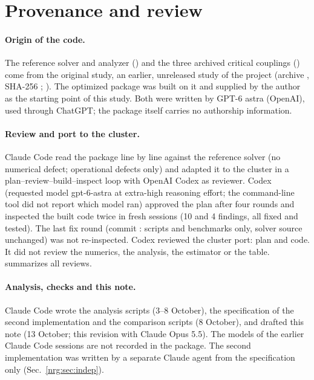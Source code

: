 \section{Provenance and review}\label{nrg:app:provenance}
\paragraph{Origin of the code.} The reference solver and analyzer () and the three
archived critical couplings () come from the original study, an earlier, unreleased study of
the project (archive , SHA-256 ; ). The
optimized package  was built on it and supplied by the author as the starting point of this study. Both
were written by GPT-6 astra (OpenAI), used through ChatGPT; the package itself carries no authorship information.

\paragraph{Review and port to the cluster.} Claude Code read the package line by line against the reference solver (no numerical
defect; operational defects only) and adapted it to the cluster in a plan--review--build--inspect loop with OpenAI Codex as reviewer.
Codex (requested model gpt-6-astra at extra-high reasoning effort; the command-line tool did not report which model ran) approved the
plan after four rounds and inspected the built code twice in fresh sessions (10 and 4 findings, all fixed and tested). The last fix
round (commit : scripts and benchmarks only, solver source unchanged) was not re-inspected. Codex reviewed the cluster port:
plan and code. It did not review the numerics, the analysis, the estimator or the table.  summarizes all reviews.

\paragraph{Analysis, checks and this note.} Claude Code wrote the analysis scripts (3--8 October), the specification of the second
implementation and the comparison scripts (8 October), and drafted this note (13 October; this revision with Claude Opus 5.5). The
models of the earlier Claude Code sessions are not recorded in the package. The second implementation was written by a separate Claude
agent from the specification only (Sec.~\ref{nrg:sec:indep}).

